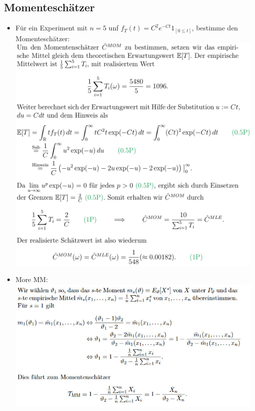 \subsection{Momenteschätzer}
\begin{itemize}
    \item Für ein Experiment mit $n=5$ unf $f_T(t) = C^2 e^{-Ct} 1_{[0 \le t]}$, bestimme den Momenteschätzer:
        \\\includegraphics[width=\linewidth]{./Figures/Momente_Schaetzer.png}
    \item More MM:
        \\\includegraphics[width=\linewidth]{./Figures/MomenteschaetzerII.jpg}
\end{itemize}

